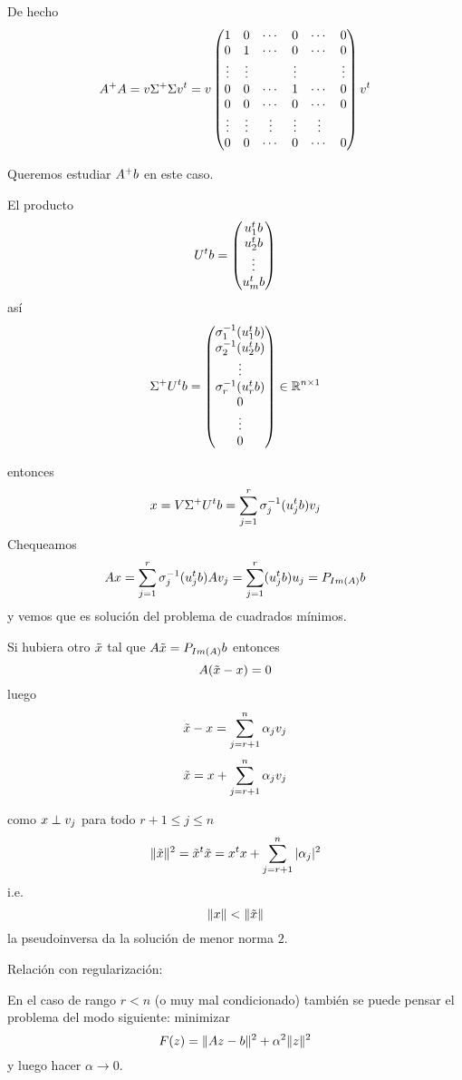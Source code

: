 De hecho
$$
\Ab^+\Ab=
\vb\Sigma^+\Sigma\vb^t=
\vb\begin{pmatrix}
1&0&\cdots &0&\cdots &0\\
0&1&\cdots &0&\cdots &0\\
\vdots&\vdots&&\vdots&&\vdots\\
0&0&\cdots &1&\cdots &0\\
0&0&\cdots &0&\cdots &0\\
\vdots &\vdots&\vdots &\vdots &\vdots\\

0&0& \cdots &0&\cdots &0\\

\end{pmatrix}
\vb^t
$$

Queremos estudiar $\Ab^+\bb$ en este caso.

El producto 
$$
\Ub^t\bb=
\begin{pmatrix}
\ub_1^t\bb\\
\ub_2^t\bb\\
\vdots\\
\ub_m^t\bb
\end{pmatrix}
$$
así
$$
\Sigma^+\Ub^t\bb=
\begin{pmatrix}
\sigma_1^{-1}(\ub_1^t\bb)\\
\sigma_2^{-1}(\ub_2^t\bb)\\
\vdots\\
\sigma_r^{-1}(\ub_r^t\bb)\\
0\\
\vdots\\
0
\end{pmatrix} \in \R^{n\times 1}
$$

entonces
$$
\xb=\Vb\Sigma^+\Ub^t\bb=
\sum_{j=1}^r\sigma_j^{-1}(\ub_j^t\bb)\vb_j
$$
Chequeamos
$$
\Ab\xb=\sum_{j=1}^r\sigma_j^{-1}(\ub_j^t\bb)\Ab\vb_j=\sum_{j=1}^r(\ub_j^t\bb)\ub_j=P_{Im(A)}\bb
$$
y vemos que es solución del problema de cuadrados mínimos.

Si hubiera otro $\tilde \xb$ tal que $\Ab\tilde\xb=P_{Im(A)}\bb$ entonces
$$
\Ab(\tilde\xb-\xb)=\cero
$$
luego
$$
\tilde\xb-\xb=\sum_{j=r+1}^n\alpha_j\vb_j
$$
$$
\tilde\xb= \xb+\sum_{j=r+1}^n\alpha_j\vb_j
$$

como $\xb\perp \vb_j$ para todo $r+1\le j\le n$
$$
\|\tilde\xb\|^2=\tilde\xb^t\tilde\xb=\xb^t\xb+\sum_{j=r+1}^n|\alpha_j|^2
$$
i.e.
$$
\|\xb\|<\|\tilde\xb\|
$$
la pseudoinversa da la solución de menor norma $2$.
 
 \centerline {Relación con regularización:} 

En el caso de rango $r<n$ (o muy mal condicionado) también se puede pensar el problema del modo siguiente: minimizar
 $$
 F(\zb)=\|\Ab\zb-\bb\|^2+\alpha^2\|\zb\|^2
 $$
 y luego hacer $\alpha\to 0$. 
 

